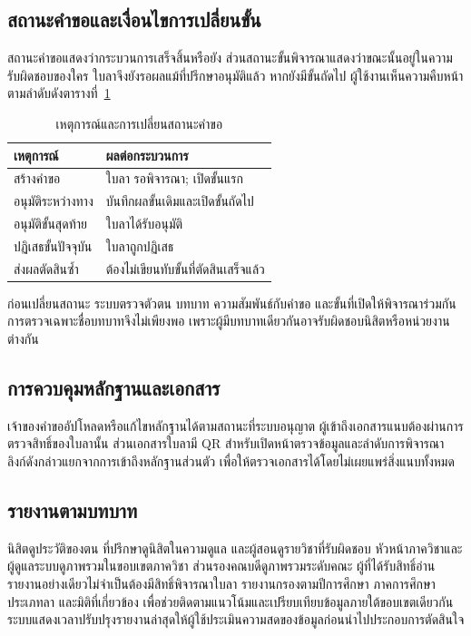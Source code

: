 \subsection{สถานะคำขอและเงื่อนไขการเปลี่ยนขั้น}
สถานะคำขอแสดงว่ากระบวนการเสร็จสิ้นหรือยัง
ส่วนสถานะขั้นพิจารณาแสดงว่าขณะนั้นอยู่ในความรับผิดชอบของใคร
ใบลาจึงยังรอผลแม้ที่ปรึกษาอนุมัติแล้ว หากยังมีขั้นถัดไป
ผู้ใช้งานเห็นความคืบหน้าตามลำดับดังตารางที่~\ref{tab:state-transition}
\begin{table}[H]
  \caption{เหตุการณ์และการเปลี่ยนสถานะคำขอ}\label{tab:state-transition}
  \centering
  \begin{tabularx}{\columnwidth}{|p{25mm}|X|}
    \hline
    เหตุการณ์ & ผลต่อกระบวนการ \\ \hline
    สร้างคำขอ & ใบลา รอพิจารณา; เปิดขั้นแรก \\ \hline
    อนุมัติระหว่างทาง & บันทึกผลขั้นเดิมและเปิดขั้นถัดไป \\ \hline
    อนุมัติขั้นสุดท้าย & ใบลาได้รับอนุมัติ \\ \hline
    ปฏิเสธขั้นปัจจุบัน & ใบลาถูกปฏิเสธ \\ \hline
    ส่งผลตัดสินซ้ำ & ต้องไม่เขียนทับขั้นที่ตัดสินเสร็จแล้ว \\ \hline
  \end{tabularx}
\end{table}
ก่อนเปลี่ยนสถานะ ระบบตรวจตัวตน บทบาท ความสัมพันธ์กับคำขอ
และขั้นที่เปิดให้พิจารณาร่วมกัน การตรวจเฉพาะชื่อบทบาทจึงไม่เพียงพอ
เพราะผู้มีบทบาทเดียวกันอาจรับผิดชอบนิสิตหรือหน่วยงานต่างกัน
\subsection{การควบคุมหลักฐานและเอกสาร}
เจ้าของคำขออัปโหลดหรือแก้ไขหลักฐานได้ตามสถานะที่ระบบอนุญาต
ผู้เข้าถึงเอกสารแนบต้องผ่านการตรวจสิทธิ์ของใบลานั้น ส่วนเอกสารใบลามี
QR สำหรับเปิดหน้าตรวจข้อมูลและลำดับการพิจารณา
ลิงก์ดังกล่าวแยกจากการเข้าถึงหลักฐานส่วนตัว
เพื่อให้ตรวจเอกสารได้โดยไม่เผยแพร่สิ่งแนบทั้งหมด
\subsection{รายงานตามบทบาท}
นิสิตดูประวัติของตน ที่ปรึกษาดูนิสิตในความดูแล
และผู้สอนดูรายวิชาที่รับผิดชอบ
หัวหน้าภาควิชาและผู้ดูแลระบบดูภาพรวมในขอบเขตภาควิชา
ส่วนรองคณบดีดูภาพรวมระดับคณะ
ผู้ที่ได้รับสิทธิ์อ่านรายงานอย่างเดียวไม่จำเป็นต้องมีสิทธิ์พิจารณาใบลา
รายงานกรองตามปีการศึกษา ภาคการศึกษา ประเภทลา และมิติที่เกี่ยวข้อง
เพื่อช่วยติดตามแนวโน้มและเปรียบเทียบข้อมูลภายใต้ขอบเขตเดียวกัน
ระบบแสดงเวลาปรับปรุงรายงานล่าสุดให้ผู้ใช้ประเมินความสดของข้อมูลก่อนนำไปประกอบการตัดสินใจ
